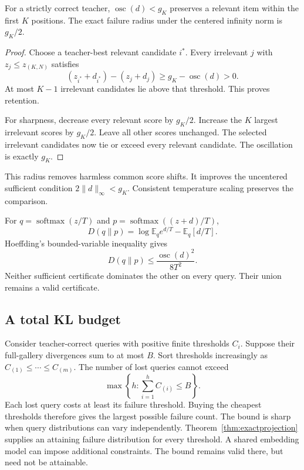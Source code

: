 \begin{theorem}
For a strictly correct teacher, $\operatorname{osc}(d)<g_K$ preserves a relevant item within the first $K$ positions.
The exact failure radius under the centered infinity norm is $g_K/2$.
\end{theorem}
\begin{proof}
Choose a teacher-best relevant candidate $i^*$.
Every irrelevant $j$ with $z_j\leq z_{(K,N)}$ satisfies
\begin{equation}
(z_{i^*}+d_{i^*})-(z_j+d_j)
\geq g_K-\operatorname{osc}(d)>0.
\end{equation}
At most $K-1$ irrelevant candidates lie above that threshold.
This proves retention.

For sharpness, decrease every relevant score by $g_K/2$.
Increase the $K$ largest irrelevant scores by $g_K/2$.
Leave all other scores unchanged.
The selected irrelevant candidates now tie or exceed every relevant candidate.
The oscillation is exactly $g_K$.
\end{proof}

This radius removes harmless common score shifts.
It improves the uncentered sufficient condition $2\|d\|_\infty<g_K$.
Consistent temperature scaling preserves the comparison.

For $q=\operatorname{softmax}(z/T)$ and $p=\operatorname{softmax}((z+d)/T)$,
\begin{equation}
D(q\|p)=\log\mathbb E_q e^{d/T}-\mathbb E_q[d/T].
\end{equation}
Hoeffding's bounded-variable inequality gives
\begin{equation}
D(q\|p)\leq\frac{\operatorname{osc}(d)^2}{8T^2}.
\end{equation}
Neither sufficient certificate dominates the other on every query.
Their union remains a valid certificate.

\subsection{A total KL budget}
Consider teacher-correct queries with positive finite thresholds $C_i$.
Suppose their full-gallery divergences sum to at most $B$.
Sort thresholds increasingly as $C_{(1)}\leq\cdots\leq C_{(m)}$.
The number of lost queries cannot exceed
\begin{equation}
\max\left\{h:\sum_{i=1}^hC_{(i)}\leq B\right\}.
\end{equation}
Each lost query costs at least its failure threshold.
Buying the cheapest thresholds therefore gives the largest possible failure count.
The bound is sharp when query distributions can vary independently.
Theorem~\ref{thm:exactprojection} supplies an attaining failure distribution for every threshold.
A shared embedding model can impose additional constraints.
The bound remains valid there, but need not be attainable.

